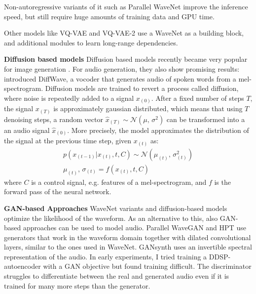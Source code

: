 Non-autoregressive variants of it such as Parallel WaveNet \citep{oord_parallel_2017} improve the inference speed, but still require huge amounts of training data and GPU time.

Other models like VQ-VAE and VQ-VAE-2 \citep{vqvae} \citep{vqvae2} use a WaveNet as a building block, and additional modules to learn long-range dependencies.





\textbf{Diffusion based models} Diffusion based models recently became very popular for image generation \citep{dhariwal_diffusion_2021}.
For audio generation, they also show promising results: \citet{kong_diffwave_2021} introduced DiffWave, a vocoder that generates audio of spoken words from a mel-spectrogram.
Diffusion models are trained to revert a process called diffusion, where noise is repeatedly added to a signal $x_{(0)}$.
After a fixed number of steps $T$, the signal $x_{(T)}$ is approximately gaussian distributed, which means that using $T$ denoising steps, a random vector $\hat{x}_{(T)} \sim \mathcal{N}(\mu,\,\sigma^{2})$ can be transformed into a an audio signal $\hat{x}_{(0)}$.
More precisely, the model approximates the distribution of the signal at the previous time step, given $x_{(t)}$ as:
\begin{equation}
    \begin{split}
p(x_{(t-1)} | x_{(t)}, t, C) \sim \mathcal{N}(\mu_{(t)},\,\sigma_{(t)}^{2}) \\
\mu_{(t)},\,\sigma_{(t)} = f(x_{(t)}, t, C)
\end{split}
\end{equation}
where $C$ is a control signal, e.g. features of a mel-spectrogram, and $f$ is the forward pass of the neural network. \newline


\textbf{GAN-based Approaches}
WaveNet variants and diffusion-based models optimize the likelihood of the waveform. As an alternative to this, also GAN-based approaches can be used to model audio. 
Parallel WaveGAN \citep{yamamoto_parallel_2020} and HPT \citep{michelashvili_hierarchical_2020} use generators that work in the waveform domain together with dilated convolutional layers, similar to the ones used in WaveNet. GANsynth \citep{engel_gansynth_2019} uses an invertible spectral representation of the audio. \newline
In early experiments, I tried training a DDSP-autoencoder with a GAN objective but found training difficult. The discriminator struggles to differentiate between the real and generated audio even if it is trained for many more steps than the generator.

